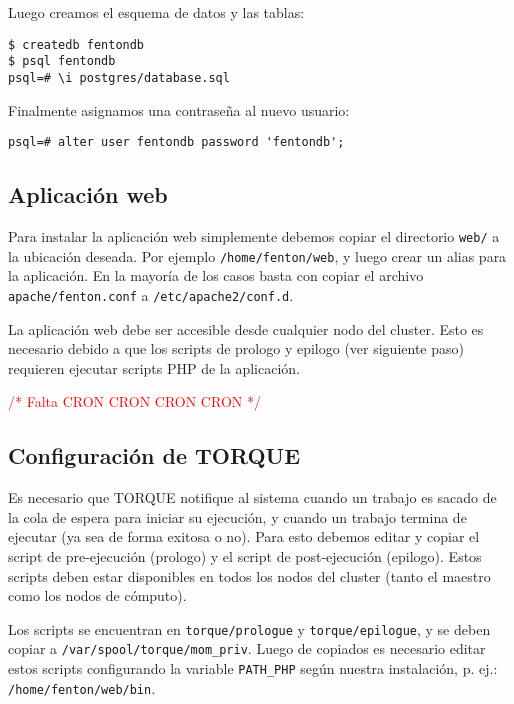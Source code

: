 \documentclass[a4paper,10pt,spanish]{article}
\begin{document}
Luego creamos el esquema de datos y las tablas:

\begin{verbatim}
$ createdb fentondb 
$ psql fentondb
psql=# \i postgres/database.sql
\end{verbatim}

Finalmente asignamos una contrase\~{n}a al nuevo usuario:

\begin{verbatim}
psql=# alter user fentondb password 'fentondb';
\end{verbatim}

\subsection{Aplicaci\'{o}n web}

Para instalar la aplicaci\'{o}n web simplemente debemos copiar el directorio \mbox{\texttt{web/}} a la ubicaci\'{o}n deseada. Por ejemplo \mbox{\texttt{/home/fenton/web}}, y luego crear un alias para la aplicaci\'{o}n. En la mayor\'{i}a de los casos basta con copiar el archivo \mbox{\texttt{apache/fenton.conf}} a \mbox{\texttt{/etc/apache2/conf.d}}.

La aplicaci\'{o}n web debe ser accesible desde cualquier nodo del cluster. Esto es necesario debido a que los scripts de prologo y epilogo (ver siguiente paso) requieren ejecutar scripts PHP de la aplicaci\'{o}n.

\textcolor{red}{\Large /{*} Falta CRON CRON CRON CRON {*}/}

\subsection{Configuraci\'{o}n de TORQUE}

Es necesario que TORQUE notifique al sistema cuando un trabajo es sacado de la cola de espera para iniciar su ejecuci\'{o}n, y cuando un trabajo termina de ejecutar (ya sea de forma exitosa o no). Para esto debemos editar y copiar el script de pre-ejecuci\'{o}n (prologo) y el script de post-ejecuci\'{o}n (epilogo). Estos scripts deben estar disponibles en todos los nodos del cluster (tanto el maestro como los nodos de c\'{o}mputo). 

Los scripts se encuentran en \mbox{\texttt{torque/prologue}} y \mbox{\texttt{torque/epilogue}}, y se deben copiar a \mbox{\texttt{/var/spool/torque/mom\_priv}}. Luego de copiados es necesario editar estos scripts configurando la variable \mbox{\texttt{PATH\_PHP}} seg\'{u}n nuestra instalaci\'{o}n, p. ej.: \mbox{\texttt{/home/fenton/web/bin}}.
\end{document}
